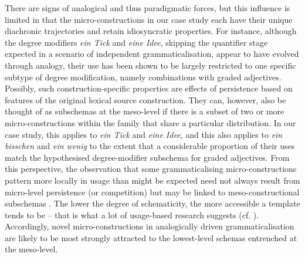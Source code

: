 \documentclass[output=paper]{langsci/langscibook}
\begin{document}
There are signs of analogical and thus paradigmatic forces, but this influence is limited in that the micro\hyp{}constructions in our case study each have their unique diachronic trajectories and retain idiosyncratic properties. For instance, although the degree modifiers \textit{ein Tick} and \textit{eine Idee}, skipping the quantifier stage expected in a scenario of independent grammaticalisation, appear to have evolved through analogy, their use has been shown to be largely restricted to one specific subtype of degree modification, namely combinations with graded adjectives. Possibly, such construction-specific properties are effects of persistence \citep{Hopperprinciplesgrammaticalization1991} based on features of the original lexical source construction. They can, however, also be thought of as subschemas at the meso-level if there is a subset of two or more micro\hyp{}constructions within the family that share a particular distribution. In our case study, this applies to \textit{ein Tick} and \textit{eine Idee}, and this also applies to \textit{ein bisschen} and \textit{ein wenig} to the extent that a considerable proportion of their uses match the hypothesised degree\hyp{}modifier subschema for graded adjectives. From this perspective, the observation that some grammaticalising micro\hyp{}constructions pattern more locally in usage than might be expected need not always result from micro-level persistence (or competition) but may be linked to meso-constructional subschemas \citep[cf.][29]{LangackerDynamicUsageBasedModel2000}. The lower the degree of schematicity, the more accessible a template tends to be – that is what a lot of usage-based research suggests (cf. ). Accordingly, novel micro\hyp{}constructions in analogically driven grammaticalisation are likely to be most strongly attracted to the lowest-level schemas entrenched at the meso-level.
\end{document}
